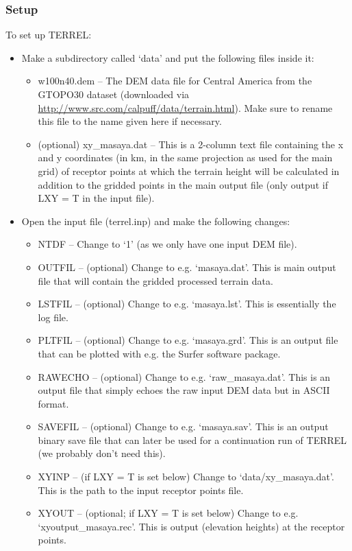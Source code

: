 \documentclass[10pt,a4paper]{article}
\begin{document}
\subsubsection{Setup}
To set up TERREL:
\begin{itemize}
\item Make a subdirectory called `data' and put the following files inside it:
\begin{itemize}
\item w100n40.dem -- The DEM data file for Central America from the GTOPO30 dataset (downloaded via \url{http://www.src.com/calpuff/data/terrain.html}). Make sure to rename this file to the name given here if necessary.
\item (optional) xy\_masaya.dat -- This is a 2-column text file containing the x and y coordinates (in km, in the same projection as used for the main grid) of receptor points at which the terrain height will be calculated in addition to the gridded points in the main output file (only output if LXY = T in the input file).
\end{itemize}
\item Open the input file (terrel.inp) and make the following changes:
\begin{itemize}
\item NTDF -- Change to `1' (as we only have one input DEM file).
\item OUTFIL -- (optional) Change to e.g. `masaya.dat'. This is main output file that will contain the gridded processed terrain data.
\item LSTFIL -- (optional) Change to e.g. `masaya.lst'. This is essentially the log file.
\item PLTFIL -- (optional) Change to e.g. `masaya.grd'. This is an output file that can be plotted with e.g. the Surfer software package.
\item RAWECHO -- (optional) Change to e.g. `raw\_masaya.dat'. This is an output file that simply echoes the raw input DEM data but in ASCII format.
\item SAVEFIL -- (optional) Change to e.g. `masaya.sav'. This is an output binary save file that can later be used for a continuation run of TERREL (we probably don't need this).
\item XYINP -- (if LXY = T is set below) Change to `data/xy\_masaya.dat'. This is the path to the input receptor points file.
\item XYOUT -- (optional; if LXY = T is set below) Change to e.g. `xyoutput\_masaya.rec'. This is output (elevation heights) at the receptor points.

\end{itemize}
\end{itemize}
\end{document}
